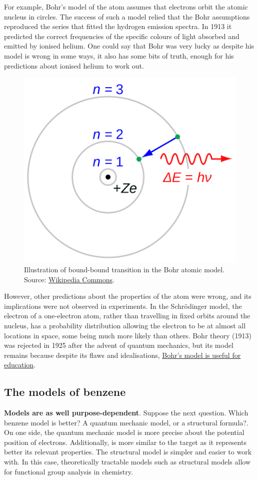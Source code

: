 \documentclass[
]{book}
\begin{document}
For example, Bohr's model of the atom assumes that electrons orbit the atomic nucleus in circles. The success of such a model relied that the Bohr assumptions reproduced the series that fitted the hydrogen emission spectra. In 1913 it predicted the correct frequencies of the specific colours of light absorbed and emitted by ionised helium. One could say that Bohr was very lucky as despite his model is wrong in some ways, it also has some bits of truth, enough for his predictions about ionised helium to work out.



\begin{figure}[hbtp]

{\centering \includegraphics[width=0.33\linewidth]{Figures/bohr-atom-model} 

}

\caption{Illustration of bound-bound transition in the Bohr atomic model. Source: \href{https://commons.wikimedia.org/wiki/File:Bohr_atom_model.svg}{Wikipedia Commons}.}\label{fig:bohr-model}
\end{figure}

However, other predictions about the properties of the atom were wrong, and its implications were not observed in experiments. In the Schrödinger model, the electron of a one-electron atom, rather than travelling in fixed orbits around the nucleus, has a probability distribution allowing the electron to be at almost all locations in space, some being much more likely than others. Bohr theory (1913) was rejected in 1925 after the advent of quantum mechanics, but its model remains because despite its flaws and idealisations, \href{https://blogs.scientificamerican.com/guest-blog/why-it-s-okay-to-teach-wrong-ideas-in-physics/}{Bohr's model is useful for education}.

\hypertarget{the-models-of-benzene}{%
\subsection{The models of benzene}\label{the-models-of-benzene}}

\textbf{Models are as well purpose-dependent}. Suppose the next question. Which benzene model is better? A quantum mechanic model, or a structural formula?. On one side, the quantum mechanic model is more precise about the potential position of electrons. Additionally, is more similar to the target as it represents better its relevant properties. The structural model is simpler and easier to work with. In this case, theoretically tractable models such as structural models allow for functional group analysis in chemistry.
\end{document}
